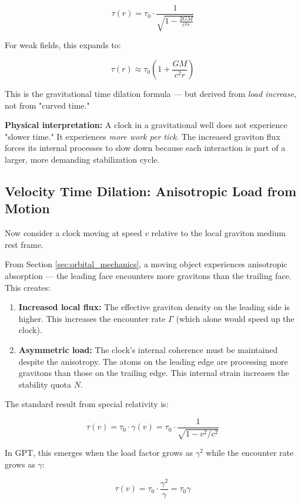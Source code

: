 \documentclass[12pt, a4paper]{article}
\begin{document}
\[
\tau(r) = \tau_0 \cdot \frac{1}{\sqrt{1 - \frac{2GM}{c^2 r}}}
\]

For weak fields, this expands to:

\[
\tau(r) \approx \tau_0 \left(1 + \frac{GM}{c^2 r}\right)
\]

This is the gravitational time dilation formula — but derived from \textit{load increase}, not from "curved time."

\textbf{Physical interpretation:} A clock in a gravitational well does not experience "slower time." It experiences \textit{more work per tick}. The increased graviton flux forces its internal processes to slow down because each interaction is part of a larger, more demanding stabilization cycle.

\subsection{Velocity Time Dilation: Anisotropic Load from Motion}
\label{subsec:velocity_dilation}

Now consider a clock moving at speed \( v \) relative to the local graviton medium rest frame.

From Section \ref{sec:orbital_mechanics}, a moving object experiences anisotropic absorption — the leading face encounters more gravitons than the trailing face. This creates:

\begin{enumerate}
    \item \textbf{Increased local flux:} The effective graviton density on the leading side is higher. This increases the encounter rate \( \Gamma \) (which alone would speed up the clock).
    
    \item \textbf{Asymmetric load:} The clock's internal coherence must be maintained despite the anisotropy. The atoms on the leading edge are processing more gravitons than those on the trailing edge. This internal strain increases the stability quota \( N \).
\end{enumerate}

The standard result from special relativity is:

\[
\tau(v) = \tau_0 \cdot \gamma(v) = \tau_0 \cdot \frac{1}{\sqrt{1 - v^2/c^2}}
\]

In GPT, this emerges when the load factor grows as \( \gamma^2 \) while the encounter rate grows as \( \gamma \):

\[
\tau(v) = \tau_0 \cdot \frac{\gamma^2}{\gamma} = \tau_0 \gamma
\]
\end{document}
